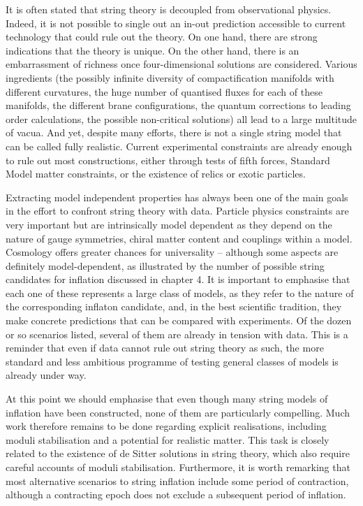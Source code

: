  It is often stated that string theory is decoupled from observational physics. Indeed, it is not possible to single out an in-out prediction accessible to current technology  that could rule out the theory. On one hand, there are strong indications that the theory is unique. On the other hand, there is an embarrassment of richness  once four-dimensional solutions are considered. Various ingredients (the possibly infinite diversity of compactification manifolds with different curvatures,  the huge number of quantised fluxes for each of these manifolds, the different brane configurations, the quantum corrections to leading order calculations, the possible non-critical solutions) all lead to a large multitude of vacua.
 And yet, despite many efforts, there is not a single string model that can be called fully realistic. Current experimental constraints are already enough to rule out most constructions, either through tests of fifth forces, Standard Model matter constraints, or the existence of relics or exotic particles.
 
 Extracting model independent properties has always been one of the main goals in the effort to confront string theory with data. Particle physics constraints are very important but are intrinsically model dependent as they depend on the
 nature of gauge symmetries, chiral matter content and couplings within a model. Cosmology offers greater chances for universality -- although some aspects are definitely model-dependent, as illustrated by the number of possible string candidates for inflation discussed in chapter 4. It is important to emphasise that each one of these represents a large class of models, as they refer to the nature of the corresponding inflaton candidate, and, in the best scientific tradition, they make concrete predictions that can be compared with experiments. Of the dozen or so scenarios listed, several of them are already in tension with data. This is a reminder that even if data cannot rule out string theory as such, the more standard and less ambitious programme of testing general classes of models is already under way. 
 
At this point we should emphasise that even though many string models of inflation have been constructed, none of them are particularly compelling. Much work therefore remains to be done regarding explicit realisations,  including moduli stabilisation and a potential for realistic matter. This task is closely related to the existence of de Sitter solutions in string theory, which also require careful accounts of moduli stabilisation. Furthermore, it is worth remarking that most alternative scenarios to string inflation include some period of contraction, although a contracting epoch does not exclude a subsequent period of inflation. 

